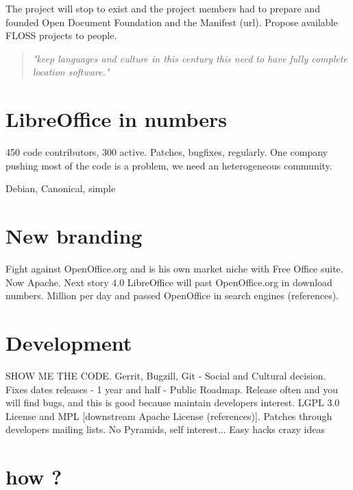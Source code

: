 \documentclass[11pt]{scrartcl}
\begin{document}
The project will stop to exist and the project members had to prepare and founded Open Document Foundation and the Manifest (url). Propose available FLOSS projects to people.

\begin{quotation}
    \emph{"keep languages and culture in this century this need to have fully complete location software."}
\end{quotation}


\section{LibreOffice in numbers}
\label{sec:numbers}

450 code contributors, 300 active. Patches, bugfixes, regularly.
One company pushing most of the code is a problem, we need an heterogeneous community. 

Debian, Canonical, simple


\section{New branding}
\label{sec:brand-awareness}

Fight against OpenOffice.org and is his own market niche with Free Office suite. Now Apache.
Next story 4.0 LibreOffice will past OpenOffice.org in download numbers. Million per day and passed OpenOffice in search engines (references).


\section{Development}
\label{sec:development}

SHOW ME THE CODE.
Gerrit, Bugzill, Git - Social and Cultural decision.
Fixes dates releases - 1 year and half - Public Roadmap. Release often and you will find bugs, and this is good because maintain developers interest.
LGPL 3.0 License and MPL [downstream Apache License (references)].
Patches through developers mailing lists.
No Pyramids, self interest... 
Easy hacks %
crazy ideas %


\section{how ?}
\label{sec:how}
\end{document}
